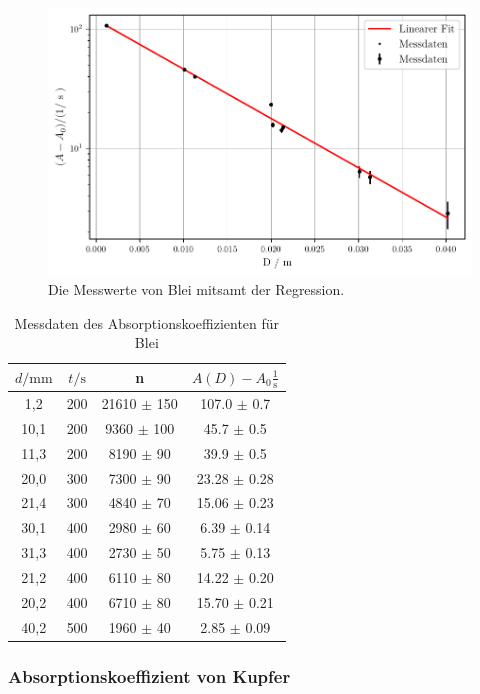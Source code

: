\begin{figure}
    \centering
    \includegraphics[width=0.7 \linewidth]{build/plot1.pdf}
    \caption{Die Messwerte von Blei mitsamt der Regression.}
    \label{fig:plot1}
\end{figure}


\begin{table}[H]
    \centering
    \caption{Messdaten des Absorptionskoeffizienten für Blei}
    \label{tab:md1blei}
    \begin{tabular}{c c c c}
        \toprule
        $d / \unit{\milli\meter}$ &  $t / \unit\second$ &     n & $A(D) - A_0 \frac{1}{\unit\second}$\\ 
        \midrule
            1,2 &  200 & 21610 $\pm$ 150 &  107.0 $\pm$ 0.7 \\
           10,1 &  200 &  9360 $\pm$ 100 &   45.7 $\pm$ 0.5 \\
           11,3 &  200 &  8190 $\pm$ 90  &   39.9 $\pm$ 0.5 \\
           20,0 &  300 &  7300 $\pm$ 90  & 23.28  $\pm$ 0.28 \\
           21,4 &  300 &  4840 $\pm$ 70  & 15.06  $\pm$ 0.23 \\
           30,1 &  400 &  2980 $\pm$ 60  &  6.39  $\pm$ 0.14 \\
           31,3 &  400 &  2730 $\pm$ 50  &  5.75  $\pm$ 0.13 \\
           21,2 &  400 &  6110 $\pm$ 80  & 14.22  $\pm$ 0.20 \\
           20,2 &  400 &  6710 $\pm$ 80  & 15.70  $\pm$ 0.21 \\
           40,2 &  500 &  1960 $\pm$ 40  &  2.85  $\pm$ 0.09 \\
        \bottomrule
    \end{tabular}
\end{table}

\subsubsection*{Absorptionskoeffizient von Kupfer}

